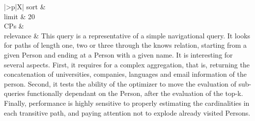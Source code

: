 \begin{tabularx}{\queryCardWidth}{|>{\queryPropertyCell}p{\queryPropertyCellWidth}|X|}
		sort		&
		\innerCardVSpace \\ \hline
	limit & 20 \\ \hline
	CPs &
	 \\ \hline
	relevance &
		\small This query is a representative of a simple navigational query. It looks for paths of length one, two or three through
the knows relation, starting from a given Person and ending at a Person with a given name. It is interesting for several
aspects. First, it requires for a complex aggregation, that is, returning the concatenation of universities, companies,
languages and email information of the person. Second, it tests the ability of the optimizer to move the evaluation of
sub-queries functionally dependant on the Person, after the evaluation of the top-k. Finally, performance is
highly sensitive to properly estimating the cardinalities in each transitive path, and paying attention not to explode
already visited Persons.
 \\ \hline%
\end{tabularx}
\queryCardVSpace